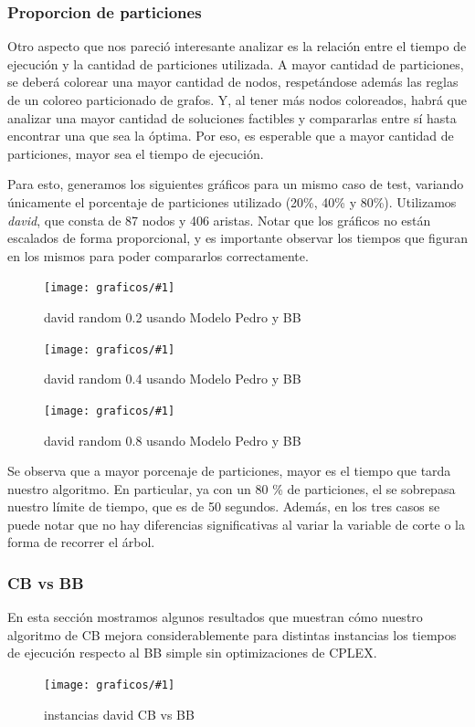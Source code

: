 \documentclass[a4paper, 10pt, twoside]{article}
\newcommand{\diagramavfig}[2]{%
  \begin{figure}[H]
    \texttt{[image: graficos/\#1]}%
    \caption{#2}
    \label{fig:#1}
  \end{figure}
}
\newcommand{\diagramavfigChico}[2]{%
  \begin{figure}[H]
    \texttt{[image: graficos/\#1]}%
    \caption{#2}
    \label{fig:#1}
  \end{figure}
}
\begin{document}
\subsubsection{Proporcion de particiones}
Otro aspecto que nos pareció interesante analizar es la relación entre el tiempo de ejecución y la cantidad de particiones utilizada. A mayor cantidad de particiones, se deberá colorear una mayor cantidad de nodos, respetándose además las reglas de un coloreo particionado de grafos. Y, al tener más nodos coloreados, habrá que analizar una mayor cantidad de soluciones factibles y compararlas entre sí hasta encontrar una que sea la óptima. Por eso, es esperable que a mayor cantidad de particiones, mayor sea el tiempo de ejecución.

Para esto, generamos los siguientes gráficos para un mismo caso de test, variando únicamente el porcentaje de particiones utilizado (20\%, 40\% y 80\%). Utilizamos \emph{david}, que consta de 87 nodos y 406 aristas. Notar que los gráficos no están escalados de forma proporcional, y es importante observar los tiempos que figuran en los mismos para poder compararlos correctamente.

\diagramavfig{david_random_0.2_bb_0_segunJuntada}{david random 0.2 usando Modelo Pedro y BB}
\diagramavfig{david_random_0.4_bb_0_segunJuntada}{david random 0.4 usando Modelo Pedro y BB}
\diagramavfig{david_random_0.8_bb_0_segunJuntada}{david random 0.8 usando Modelo Pedro y BB}

Se observa que a mayor porcenaje de particiones, mayor es el tiempo que tarda nuestro algoritmo. En particular, ya con un 80 \% de particiones, el se sobrepasa nuestro límite de tiempo, que es de 50 segundos. Además, en los tres casos se puede notar que no hay diferencias significativas al variar la variable de corte o la forma de recorrer el árbol.

\subsubsection{CB vs BB}
En esta sección mostramos algunos resultados que muestran cómo nuestro algoritmo de CB mejora considerablemente para distintas instancias los tiempos de ejecución respecto al BB simple sin optimizaciones de CPLEX. 

  \begin{minipage}{\linewidth}
      \centering
      \begin{minipage}{0.49\linewidth}
	      \diagramavfigChico{david_comparandoRandomsYAlgoritmos}{instancias david CB vs BB}
      \end{minipage}
  \end{minipage}
  
\end{document}
